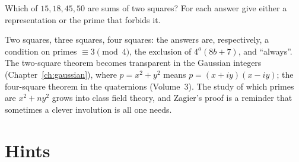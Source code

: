 \begin{exercise}[$\star$]\label{ex:t1-which20}
Which of $15,18,45,50$ are sums of two squares? For each answer give either a representation or the prime that forbids it.
\end{exercise}

\begin{beauty}
Two squares, three squares, four squares: the answers are, respectively, a condition on primes $\equiv3\pmod4$, the exclusion of $4^a(8b+7)$, and ``always''. The two-square theorem becomes transparent in the Gaussian integers (Chapter~\ref{ch:gaussian}), where $p=x^2+y^2$ means $p=(x+iy)(x-iy)$; the four-square theorem in the quaternions (Volume~3). The study of which primes are $x^2+ny^2$ grows into class field theory, and Zagier's proof is a reminder that sometimes a clever involution is all one needs.
\end{beauty}

\section{Hints}

